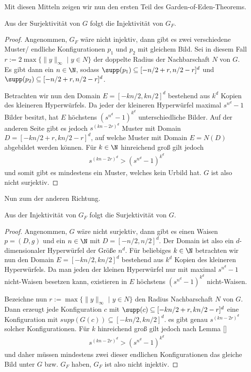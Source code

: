 Mit diesen Mitteln zeigen wir nun den ersten Teil des Garden-of-Eden-Theorems.

\begin{theorem}
 Aus der Surjektivität von $G$ folgt die Injektivität von $G_F$.
\end{theorem}

\begin{proof}
  Angenommen, $G_F$ wäre nicht injektiv, dann gibt es zwei verschiedene Muster/ endliche Konfigurationen $p_1$ und $p_2$ mit gleichem Bild. Sei in diesem Fall $r := 2 \max \{\|y\|_\infty \text{~}| \text{~} y \in N\}$ der doppelte Radius der Nachbarschaft $N$ von $G$. Es gibt dann ein $n \in \N$, sodass $\supp(p_1) \subseteq [-n/2+r, n/2 - r]^d$ und $\supp(p_2) \subseteq [-n/2+r, n/2 - r]^d$.

  Betrachten wir nun den Domain $E = [-kn/2, kn/2]^d$ bestehend aus $k^d$ Kopien des kleineren Hyperwürfels. Da jeder der kleineren Hyperwürfel maximal $s^{n^d} - 1$ Bilder besitzt, hat $E$ höchstens $(s^{n^d} - 1)^{k^d}$ unterschiedliche Bilder. Auf der anderen Seite gibt es jedoch $s^{(kn-2r)^d}$ Muster mit Domain $D = [-kn/2 + r, kn/2- r]^d$, auf welche Muster mit Domain $E = N(D)$ abgebildet werden können. Für $k \in \N$ hinreichend groß gilt jedoch
  \begin{align*}
    s^{(kn-2r)^d} > (s^{n^d} - 1)^{k^d}
  \end{align*}
  und somit gibt es mindestens ein Muster, welches kein Urbild hat. $G$ ist also nicht surjektiv.
\end{proof}




Nun zum der anderen Richtung.

\begin{theorem}[Myhill]
  Aus der Injektivität von $G_F$ folgt die Surjektivität von $G$.
\end{theorem}

\begin{proof}
  Angenommen, $G$ wäre nicht surjektiv, dann gibt es einen Waisen $p = (D,g)$ und ein $n \in \N$ mit $D = [-n/2, n/2]^d$. Der Domain ist also ein $d$-dimensionaler Hyperwürfel der Größe $n^d$. Für beliebiges $k \in \N$ betrachten wir nun den Domain $E = [-kn/2, kn/2]^d$ bestehend aus $k^d$ Kopien des kleineren Hyperwürfels. Da man jeden der kleinen Hyperwürfel nur mit maximal $s^{n^d} - 1$ nicht-Waisen besetzen kann, existieren in $E$ höchstens $(s^{n^d} - 1)^{k^d}$ nicht-Waisen.

  Bezeichne nun $r := \max \{\|y\|_\infty \text{~}| \text{~} y \in N\}$ den Radius Nachbarschaft $N$ von $G$. Dann erzeugt jede Konfiguration $c$ mit $\supp(c) \subseteq [-kn/2+r, kn/2-r]^d$ eine Konfiguration mit $supp(G(c)) \subseteq [-kn/2, kn/2]^d$. es gibt genau $s^{(kn-2r)^d}$ solcher Konfigurationen. Für $k$ hinreichend groß gilt jedoch nach Lemma []
  \begin{align*}
    s^{(kn-2r)^d} > (s^{n^d} - 1)^{k^d}
  \end{align*}
  und daher müssen mindestens zwei dieser endlichen Konfigurationen das gleiche Bild unter $G$ bzw. $G_F$ haben, $G_F$ ist also nicht injektiv.
\end{proof}


